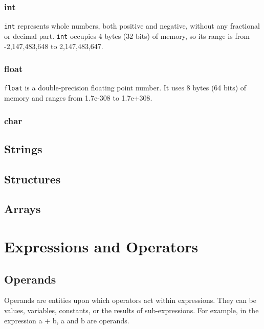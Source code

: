 \documentclass[11pt,A4]{article}
\begin{document}
            \subsubsection{int}
             \texttt{int} represents whole numbers, both positive and negative, without any fractional or decimal part. \texttt{int} occupies 4 bytes (32 bits) of memory, so its range is from -2,147,483,648 to 2,147,483,647.
            
            \subsubsection{float}
            \texttt{float} is a double-precision floating point number. It uses 8 bytes (64 bits) of memory and ranges from 1.7e-308 to 1.7e+308.
            
            \subsubsection{char}
            
            
        \subsection{Strings}
        
        
        \subsection{Structures}
        
        
        \subsection{Arrays}
        

    \newpage
    \section{Expressions and Operators}
        
        \subsection{Operands}
        Operands are entities upon which operators act within expressions. They can be values, variables, constants, or the results of sub-expressions. For example, in the expression a + b, a and b are operands.
        
\end{document}
